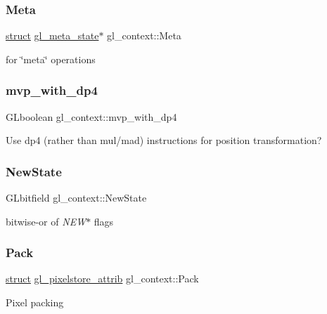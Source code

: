 \subsubsection{\texorpdfstring{Meta}{Meta}}
{\footnotesize\ttfamily \hyperlink{interfacestruct}{struct} \hyperlink{structgl__meta__state}{gl\+\_\+meta\+\_\+state}$\ast$ gl\+\_\+context\+::\+Meta}

for \char`\"{}meta\char`\"{} operations \mbox{\label{structgl__context_a66e2340b482a6d5bf04f44c4a260a380}} 
\subsubsection{\texorpdfstring{mvp\+\_\+with\+\_\+dp4}{mvp\_with\_dp4}}
{\footnotesize\ttfamily G\+Lboolean gl\+\_\+context\+::mvp\+\_\+with\+\_\+dp4}

Use dp4 (rather than mul/mad) instructions for position transformation? \mbox{\label{structgl__context_ad9bbbbb426be7fd670dfd9470da9a890}} 
\subsubsection{\texorpdfstring{New\+State}{NewState}}
{\footnotesize\ttfamily G\+Lbitfield gl\+\_\+context\+::\+New\+State}

bitwise-\/or of {\itshape N\+EW}$\ast$ flags \mbox{\label{structgl__context_a5ccb9b34c3177329f8bfc758161c60a2}} 
\subsubsection{\texorpdfstring{Pack}{Pack}}
{\footnotesize\ttfamily \hyperlink{interfacestruct}{struct} \hyperlink{structgl__pixelstore__attrib}{gl\+\_\+pixelstore\+\_\+attrib} gl\+\_\+context\+::\+Pack}

Pixel packing \mbox{\label{structgl__context_ac718578bc209874cb788abf0c41980ac}} 
